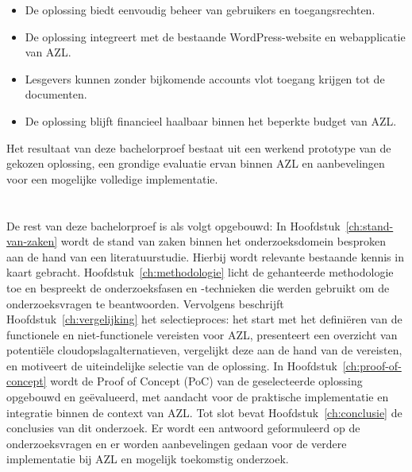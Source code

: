 \begin{itemize}
  \item De oplossing biedt eenvoudig beheer van gebruikers en toegangsrechten.
  \item De oplossing integreert met de bestaande WordPress-website en webapplicatie van AZL.
  \item Lesgevers kunnen zonder bijkomende accounts vlot toegang krijgen tot de documenten.
  \item De oplossing blijft financieel haalbaar binnen het beperkte budget van AZL.
\end{itemize}

Het resultaat van deze bachelorproef bestaat uit een werkend prototype van de gekozen oplossing, een grondige evaluatie ervan binnen AZL en aanbevelingen voor een mogelijke volledige implementatie.

\section{}%
\label{sec:opzet-bachelorproef}


De rest van deze bachelorproef is als volgt opgebouwd:
In Hoofdstuk~\ref{ch:stand-van-zaken} wordt de stand van zaken binnen het onderzoeksdomein besproken aan de hand van een literatuurstudie. Hierbij wordt relevante bestaande kennis in kaart gebracht.
Hoofdstuk~\ref{ch:methodologie} licht de gehanteerde methodologie toe en bespreekt de onderzoeksfasen en -technieken die werden gebruikt om de onderzoeksvragen te beantwoorden.
Vervolgens beschrijft Hoofdstuk~\ref{ch:vergelijking} het selectieproces: het start met het definiëren van de functionele en niet-functionele vereisten voor AZL, presenteert een overzicht van potentiële cloudopslagalternatieven, vergelijkt deze aan de hand van de vereisten, en motiveert de uiteindelijke selectie van de oplossing.
In Hoofdstuk~\ref{ch:proof-of-concept} wordt de Proof of Concept (PoC) van de geselecteerde oplossing opgebouwd en geëvalueerd, met aandacht voor de praktische implementatie en integratie binnen de context van AZL.
Tot slot bevat Hoofdstuk~\ref{ch:conclusie} de conclusies van dit onderzoek. Er wordt een antwoord geformuleerd op de onderzoeksvragen en er worden aanbevelingen gedaan voor de verdere implementatie bij AZL en mogelijk toekomstig onderzoek.